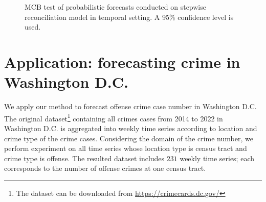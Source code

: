 \documentclass[a4paper,review,12pt,authoryear]{elsarticle}
\begin{document}
\begin{figure}
  \caption{\label{fig:sim_temporal_mcb_prob}MCB test of probabilistic forecasts conducted on stepwise reconciliation model in temporal setting. A 95\% confidence level is used.}
   \qquad
   \qquad
\end{figure}


\section{Application: forecasting crime in Washington D.C.}

We apply our method to forecast offense crime case number in Washington D.C. The original dataset\footnote{The dataset can be downloaded from \url{https://crimecards.dc.gov/}} containing all crimes cases from 2014 to 2022 in Washington D.C. is aggregated into weekly time series according to location and crime type of the crime cases. 
Considering the domain of the crime number, we perform experiment on all time series whose location type is census tract and crime type is offense.
The resulted dataset includes $231$ weekly time series; each corresponds to the number of offense crimes at one census tract.
\end{document}
